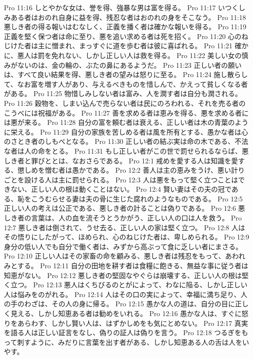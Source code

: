 Pro 11:16  しとやかな女は、誉を得、強暴な男は富を得る。
Pro 11:17  いつくしみある者はおのれ自身に益を得、残忍な者はおのれの身をそこなう。
Pro 11:18  悪しき者の得る報いはむなしく、正義を播く者は確かな報いを得る。
Pro 11:19  正義を堅く保つ者は命に至り、悪を追い求める者は死を招く。
Pro 11:20  心のねじけた者は主に憎まれ、まっすぐに道を歩む者は彼に喜ばれる。
Pro 11:21  確かに、悪人は罰を免れない、しかし正しい人は救を得る。
Pro 11:22  美しい女の慎みがないのは、金の輪の、ぶたの鼻にあるようだ。
Pro 11:23  正しい者の願いは、すべて良い結果を得、悪しき者の望みは怒りに至る。
Pro 11:24  施し散らして、なお富を増す人があり、与えるべきものを惜しんで、かえって貧しくなる者がある。
Pro 11:25  物惜しみしない者は富み、人を潤す者は自分も潤される。
Pro 11:26  穀物を、しまい込んで売らない者は民にのろわれる、それを売る者のこうべには祝福がある。
Pro 11:27  善を求める者は恵みを得る、悪を求める者には悪が来る。
Pro 11:28  自分の富を頼む者は衰える、正しい者は木の青葉のように栄える。
Pro 11:29  自分の家族を苦しめる者は風を所有とする、愚かな者は心のさとき者のしもべとなる。
Pro 11:30  正しい者の結ぶ実は命の木である、不法な者は人の命をとる。
Pro 11:31  もし正しい者がこの世で罰せられるならば、悪しき者と罪びととは、なおさらである。
Pro 12:1  戒めを愛する人は知識を愛する、懲しめを憎む者は愚かである。
Pro 12:2  善人は主の恵みをうけ、悪い計りごとを設ける人は主に罰せられる。
Pro 12:3  人は悪をもって堅く立つことはできない、正しい人の根は動くことはない。
Pro 12:4  賢い妻はその夫の冠である、恥をこうむらせる妻は夫の骨に生じた腐れのようなものである。
Pro 12:5  正しい人の考えは公正である、悪しき者の計ることは偽りである。
Pro 12:6  悪しき者の言葉は、人の血を流そうとうかがう、正しい人の口は人を救う。
Pro 12:7  悪しき者は倒されて、うせ去る、正しい人の家は堅く立つ。
Pro 12:8  人はその悟りにしたがって、ほめられ、心のねじけた者は、卑しめられる。
Pro 12:9  身分の低い人でも自分で働く者は、みずから高ぶって食に乏しい者にまさる。
Pro 12:10  正しい人はその家畜の命を顧みる、悪しき者は残忍をもって、あわれみとする。
Pro 12:11  自分の田地を耕す者は食糧に飽きる、無益な事に従う者は知恵がない。
Pro 12:12  悪しき者の堅固なやぐらは崩壊する、正しい人の根は堅く立つ。
Pro 12:13  悪人はくちびるのとがによって、わなに陥る、しかし正しい人は悩みをのがれる。
Pro 12:14  人はその口の実によって、幸福に満ち足り、人の手のわざは、その人の身に帰る。
Pro 12:15  愚かな人の道は、自分の目に正しく見える、しかし知恵ある者は勧めをいれる。
Pro 12:16  愚かな人は、すぐに怒りをあらわす、しかし賢い人は、はずかしめをも気にとめない。
Pro 12:17  真実を語る人は正しい証言をなし、偽りの証人は偽りを言う。
Pro 12:18  つるぎをもって刺すように、みだりに言葉を出す者がある、しかし知恵ある人の舌は人をいやす。

